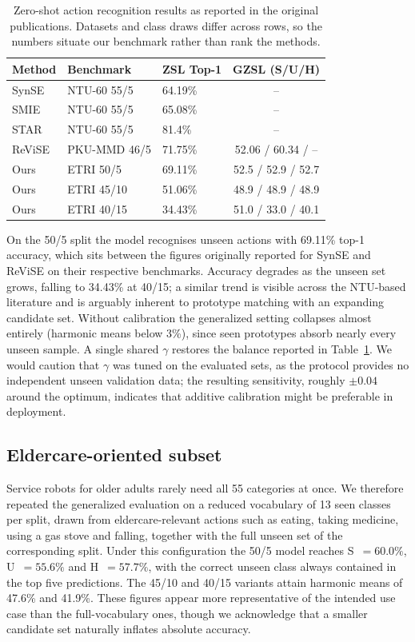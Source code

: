 \begin{table}[t]
\centering
\caption{Zero-shot action recognition results as reported in the original
publications. Datasets and class draws differ across rows, so the numbers
situate our benchmark rather than rank the methods.}
\label{tab:context}
\small
\begin{tabular}{lllc}
\hline
Method & Benchmark & ZSL Top-1 & GZSL (S/U/H) \\
\hline
SynSE~\cite{gupta2021synse}   & NTU-60 55/5  & 64.19\% & -- \\
SMIE~\cite{zhou2023smie}      & NTU-60 55/5  & 65.08\% & -- \\
STAR~\cite{chen2024star}      & NTU-60 55/5  & 81.4\%  & -- \\
ReViSE~\cite{tsai2017revise}  & PKU-MMD 46/5 & 71.75\% & 52.06 / 60.34 / -- \\
\hline
Ours & ETRI 50/5  & 69.11\% & 52.5 / 52.9 / 52.7 \\
Ours & ETRI 45/10 & 51.06\% & 48.9 / 48.9 / 48.9 \\
Ours & ETRI 40/15 & 34.43\% & 51.0 / 33.0 / 40.1 \\
\hline
\end{tabular}
\end{table}

On the 50/5 split the model recognises unseen actions with 69.11\% top-1
accuracy, which sits between the figures originally reported for SynSE and
ReViSE on their respective benchmarks. Accuracy degrades as the unseen set
grows, falling to 34.43\% at 40/15; a similar trend is visible across the
NTU-based literature and is arguably inherent to prototype matching with an
expanding candidate set. Without calibration the generalized setting collapses
almost entirely (harmonic means below 3\%), since seen prototypes absorb
nearly every unseen sample. A single shared $\gamma$ restores the balance
reported in Table~\ref{tab:context}. We would caution that $\gamma$ was tuned
on the evaluated sets, as the protocol provides no independent unseen
validation data; the resulting sensitivity, roughly $\pm0.04$ around the
optimum, indicates that additive calibration might be preferable in
deployment.

\subsection{Eldercare-oriented subset}
Service robots for older adults rarely need all 55 categories at once. We
therefore repeated the generalized evaluation on a reduced vocabulary of 13
seen classes per split, drawn from eldercare-relevant actions such as eating,
taking medicine, using a gas stove and falling, together with the full unseen
set of the corresponding split. Under this configuration the 50/5 model
reaches S~$=60.0\%$, U~$=55.6\%$ and H~$=57.7\%$, with the correct unseen
class always contained in the top five predictions. The 45/10 and 40/15
variants attain harmonic means of 47.6\% and 41.9\%. These figures appear more
representative of the intended use case than the full-vocabulary ones, though
we acknowledge that a smaller candidate set naturally inflates absolute
accuracy.

